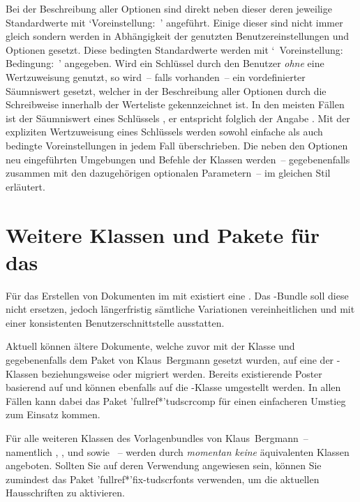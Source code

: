 Bei der Beschreibung aller Optionen sind direkt neben dieser deren jeweilige 
Standardwerte mit \mbox{\enquote*{Voreinstellung: }} angeführt. 
Einige dieser sind nicht immer gleich sondern werden in Abhängigkeit der 
genutzten Benutzereinstellungen und Optionen gesetzt. Diese bedingten 
Standardwerte werden mit 
\mbox{\enquote*{%
  Voreinstellung: \,\textbar\,Bedingung: %
}}
angegeben. Wird ein Schlüssel durch den Benutzer \emph{ohne} eine Wertzuweisung 
genutzt, so wird~-- falls vorhanden~-- ein vordefinierter Säumniswert gesetzt, 
welcher in der Beschreibung aller Optionen durch die~ 
Schreibweise innerhalb der Werteliste gekennzeichnet ist. In den meisten Fällen 
ist der Säumniswert eines Schlüssels , er entspricht folglich der 
Angabe . Mit der expliziten Wertzuweisung eines 
Schlüssels werden sowohl einfache als auch bedingte Voreinstellungen in jedem 
Fall überschrieben. Die neben den Optionen neu eingeführten Umgebungen und 
Befehle der Klassen werden~-- gegebenenfalls zusammen mit den dazugehörigen 
optionalen Parametern~-- im gleichen Stil erläutert.



\section{Weitere Klassen und Pakete für das \CD}
%
Für das Erstellen von Dokumenten im \TUDCD mit  existiert eine 
. Das \TUDScript-Bundle soll diese nicht ersetzen, 
jedoch längerfristig sämtliche Variationen vereinheitlichen und mit einer 
konsistenten Benutzerschnittstelle ausstatten. 

Aktuell können ältere Dokumente, welche zuvor mit der Klasse  
und gegebenenfalls dem Paket  von Klaus~Bergmann gesetzt 
wurden, auf eine der \TUDScript-Klassen  beziehungsweise 
 oder  migriert werden. Bereits 
existierende Poster basierend auf  und  
können ebenfalls auf die \TUDScript-Klasse  umgestellt 
werden. In allen Fällen kann dabei das Paket \Package'fullref*'{tudscrcomp} für 
einen einfacheren Umstieg zum Einsatz kommen. 

Für alle weiteren Klassen des Vorlagenbundles von Klaus~Bergmann~-- namentlich 
, ,  und  
sowie ~-- werden durch \TUDScript \emph{momentan keine} 
äquivalenten Klassen angeboten. Sollten Sie auf deren Verwendung angewiesen 
sein, können Sie zumindest das Paket \Package'fullref*'{fix-tudscrfonts} 
verwenden, um die aktuellen Hausschriften zu aktivieren.


